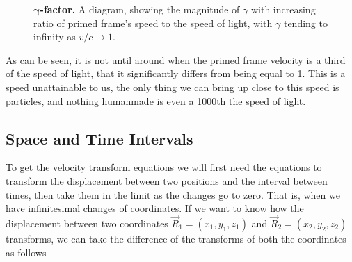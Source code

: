 \begin{figure}[H]
	\centering
	\caption{\textbf{$\boldsymbol{\gamma}$-factor.} A diagram, showing the magnitude of $\gamma$ with increasing ratio of primed frame's speed to the speed of light, with ${\gamma}$ tending to infinity as ${v}/{c}\rightarrow 1$.}
	\label{fig: Gamma Factor}
\end{figure}

As can be seen, it is not until around when the primed frame velocity is a third of the speed of light, that it significantly differs from being equal to 1.
This is a speed unattainable to us, the only thing we can bring up close to this speed is particles, and nothing humanmade is even a 1000th the speed of light.

\subsection{Space and Time Intervals} \label{subsect: Space and Time Intervals}

To get the velocity transform equations we will first need the equations to transform the displacement between two positions and the interval between times, then take them in the limit as the changes go to zero.
That is, when we have infinitesimal changes of coordinates.
If we want to know how the displacement between two coordinates ${\vec{R}_1} = (x_1,y_1,z_1)$ and ${\vec{R}_2} = (x_2,y_2,z_2)$ transforms, we can take the difference of the transforms of both the coordinates as follows

